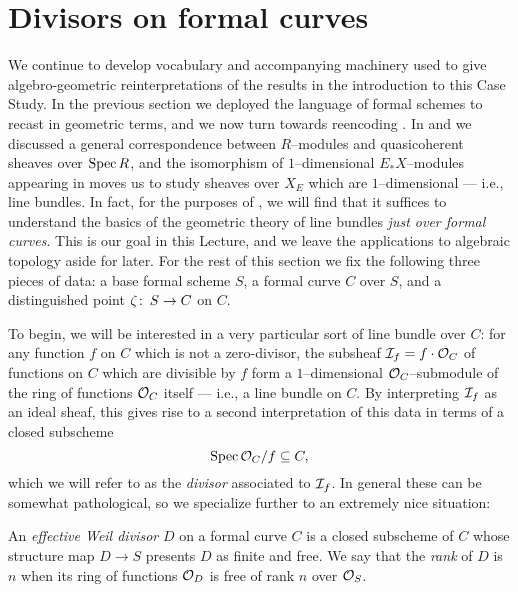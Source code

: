 \section{Divisors on formal curves}\label{CurveDivisorsSection}


We continue to develop vocabulary and accompanying machinery used to give algebro-geometric reinterpretations of the results in the introduction to this Case Study.  In the previous section we deployed the language of formal schemes to recast  in geometric terms, and we now turn towards reencoding .  In  and  we discussed a general correspondence between $R$--modules and quasicoherent sheaves over $\operatorname{Spec} R$, and the isomorphism of $1$--dimensional $E_* X$--modules appearing in  moves us to study sheaves over $X_E$ which are $1$--dimensional --- i.e., line bundles.  In fact, for the purposes of , we will find that it suffices to understand the basics of the geometric theory of line bundles \emph{just over formal curves}.  This is our goal in this Lecture, and we leave the applications to algebraic topology aside for later.  For the rest of this section we fix the following three pieces of data: a base formal scheme $S$, a formal curve $C$ over $S$, and a distinguished point $\zeta\colon\thinspace S \to C$ on $C$.

To begin, we will be interested in a very particular sort of line bundle over $C$: for any function $f$ on $C$ which is not a zero-divisor, the subsheaf $\mathcal{I}_f = f \cdot \mathcal{O}_C$ of functions on $C$ which are divisible by $f$ form a $1$--dimensional $\mathcal{O}_C$--submodule of the ring of functions $\mathcal{O}_C$ itself --- i.e., a line bundle on $C$.  By interpreting $\mathcal{I}_f$ as an ideal sheaf, this gives rise to a second interpretation of this data in terms of a closed subscheme \[\operatorname{Spec} \mathcal{O}_C / f \subseteq C,\] which we will refer to as the \textit{divisor} associated to $\mathcal{I}_f$.  In general these can be somewhat pathological, so we specialize further to an extremely nice situation:

\begin{definition}
An \textit{effective Weil divisor} $D$ on a formal curve $C$ is a closed subscheme of $C$ whose structure map $D \to S$ presents $D$ as finite and free.  We say that the \textit{rank} of $D$ is $n$ when its ring of functions $\mathcal{O}_D$ is free of rank $n$ over $\mathcal{O}_S$.
\end{definition}

